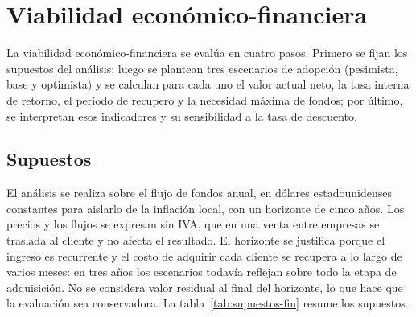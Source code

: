 \section{Viabilidad económico-financiera}\label{sec:viabilidad-fin}
La viabilidad económico-financiera se evalúa en cuatro pasos. Primero se fijan los supuestos del
análisis; luego se plantean tres escenarios de adopción (pesimista, base y optimista) y se calculan
para cada uno el valor actual neto, la tasa interna de retorno, el período de recupero y la necesidad
máxima de fondos; por último, se interpretan esos indicadores y su sensibilidad a la tasa de
descuento.

\subsection{Supuestos}
El análisis se realiza sobre el flujo de fondos anual, en dólares estadounidenses constantes para
aislarlo de la inflación local, con un horizonte de cinco años. Los precios y los flujos se expresan sin IVA, que en una venta entre
empresas se traslada al cliente y no afecta el resultado. El horizonte se justifica porque
el ingreso es recurrente y el costo de adquirir cada cliente se recupera a lo largo de varios meses:
en tres años los escenarios todavía reflejan sobre todo la etapa de adquisición. No se considera
valor residual al final del horizonte, lo que hace que la evaluación sea conservadora. La tabla~\ref{tab:supuestos-fin} resume los supuestos.

